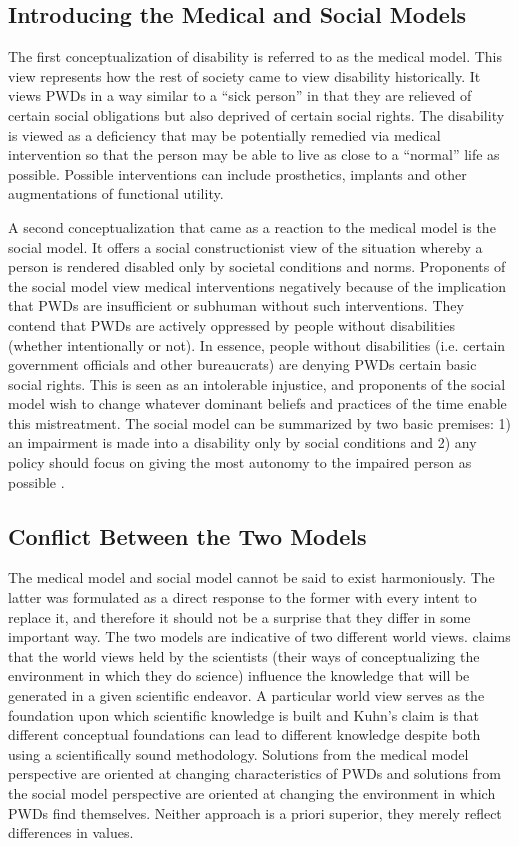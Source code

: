 \documentclass[a4paper]{article}
\begin{document}
\subsection{Introducing the Medical and Social Models} 
\label{models}

The first conceptualization of disability is referred to as the medical model.
This view represents how the rest of society came to view disability
historically. It views PWDs in a way similar to a ``sick person'' in that they
are relieved of certain social obligations but also deprived of certain social
rights. The disability is viewed as a deficiency that may be potentially
remedied via medical intervention so that the person may be able to live as
close to a ``normal'' life as possible. Possible interventions can include
prosthetics, implants and other augmentations of functional utility.

A second conceptualization that came as a reaction to the medical model is the
social model. It offers a social constructionist view of the situation whereby
a person is rendered disabled only by societal conditions and norms.
Proponents of the social model view medical interventions negatively because
of the implication that PWDs are insufficient or subhuman without such
interventions. They contend that PWDs are actively oppressed by people without
disabilities (whether intentionally or not). In essence, people without
disabilities (i.e. certain government officials and other bureaucrats) are
denying PWDs certain basic social rights. This is seen as an intolerable
injustice, and proponents of the social model wish to change whatever dominant
beliefs and practices of the time enable this mistreatment. The social model
can be summarized by two basic premises: 1) an impairment is made into a
disability only by social conditions and 2) any policy should focus on giving
the most autonomy to the impaired person as possible
\citep{winter2003development}.


\subsection{Conflict Between the Two Models}

The medical model and social model cannot be said to exist harmoniously. The
latter was formulated as a direct response to the former with every intent to
replace it, and therefore it should not be a surprise that they differ in some
important way. The two models are indicative of two different world views.
\cite{kuhn1970structure} claims that the world views held by the scientists
(their ways of conceptualizing the environment in which they do science)
influence the knowledge that will be generated in a given scientific endeavor.
A particular world view serves as the foundation upon which scientific
knowledge is built and Kuhn's claim is that different conceptual foundations
can lead to different knowledge despite both using a scientifically sound
methodology. Solutions from the medical model perspective are oriented at
changing characteristics of PWDs and solutions from the social model
perspective are oriented at changing the environment in which PWDs find
themselves. Neither approach is a priori superior, they merely reflect
differences in values.
\end{document}
